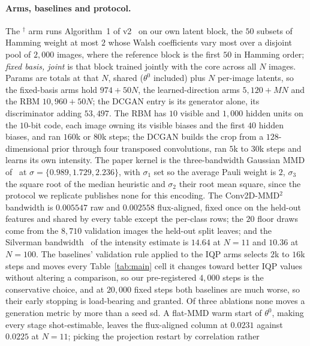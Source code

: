 \documentclass{article}
\begin{document}
\label{app:arms}

\paragraph{Arms, baselines and protocol.} The $^{\dagger}$ arm runs Algorithm~1 of
v2~\cite{liu_2026_correlation} on our own latent block, the $50$ subsets of Hamming weight at most
$2$ whose Walsh coefficients vary most over a disjoint pool of $2{,}000$ images, where the reference
block is the first $50$ in Hamming order; \emph{fixed basis, joint} is that block trained jointly
with the core across all $N$ images. Params are totals at that $N$, shared ($\theta^{0}$ included)
plus $N$ per-image latents, so the fixed-basis arms hold $974 + 50N$, the learned-direction arms
$5{,}120 + MN$ and the RBM $10{,}960 + 50N$; the DCGAN entry is its generator alone, its
discriminator adding $53{,}497$. The RBM has $10$ visible and $1{,}000$ hidden units on the $10$-bit
code, each image owning its visible biases and the first $40$ hidden biases, and ran $160$k or $80$k
steps; the DCGAN builds the crop from a $128$-dimensional prior through four transposed
convolutions, ran $5$k to $30$k steps and learns its own intensity. The paper kernel is the three-bandwidth Gaussian MMD
of~\cite{recio_2025_train} at $\sigma = \{0.989, 1.729, 2.236\}$, with $\sigma_1$ set so the average
Pauli weight is $2$, $\sigma_3$ the square root of the median heuristic and $\sigma_2$ their root
mean square, since the protocol we replicate publishes none for this encoding. The Conv2D-MMD$^2$
bandwidth is $0.005547$ raw and $0.002558$ flux-aligned, fixed once on the held-out features and
shared by every table except the per-class rows; the $20$ floor draws come from the $8{,}710$
validation images the held-out split leaves; and the Silverman
bandwidth~\cite{silverman_1986_density} of the intensity estimate is $14.64$ at $N{=}11$ and $10.36$
at $N{=}100$. The baselines' validation rule applied to the IQP arms selects $2$k to $16$k steps and
moves every Table~\ref{tab:main} cell it changes toward better IQP values without altering a
comparison, so our pre-registered $4{,}000$ steps is the conservative choice, and at $20{,}000$ fixed
steps both baselines are much worse, so their early stopping is load-bearing and granted. Of
three ablations none moves a generation metric by more than a seed sd.
A flat-MMD warm start of $\theta^{0}$, making every stage shot-estimable, leaves the flux-aligned
column at $0.0231$ against $0.0225$ at $N{=}11$; picking the projection restart by correlation rather
\end{document}

